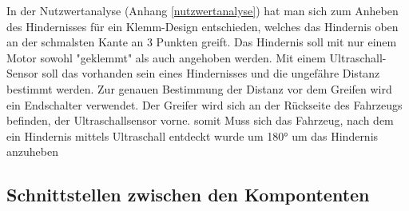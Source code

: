 In der Nutzwertanalyse (Anhang \ref{nutzwertanalyse}) hat man sich zum Anheben des Hindernisses für ein Klemm-Design entschieden, welches das Hindernis oben an der schmalsten Kante an 3 Punkten greift. Das Hindernis soll mit nur einem Motor sowohl "geklemmt" als auch angehoben werden. Mit einem Ultraschall-Sensor soll das vorhanden sein eines Hindernisses und die ungefähre Distanz bestimmt werden. Zur genauen Bestimmung der Distanz vor dem Greifen wird ein Endschalter verwendet.
Der Greifer wird sich an der Rückseite des Fahrzeugs befinden, der Ultraschallsensor vorne. somit Muss sich das Fahrzeug, nach dem ein Hindernis mittels Ultraschall entdeckt wurde um 180° um das Hindernis anzuheben


\subsection{Schnittstellen zwischen den Kompontenten}



